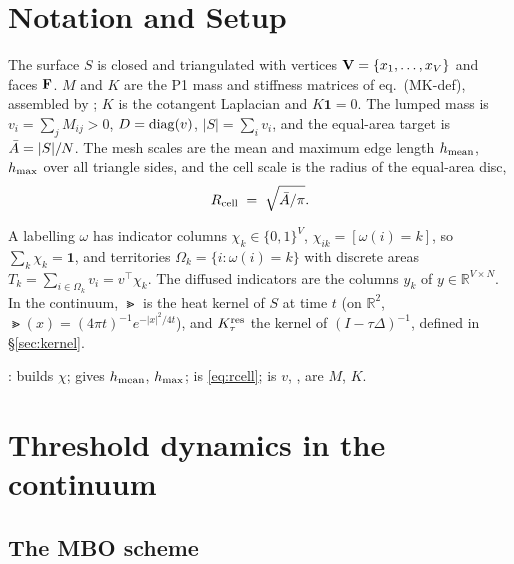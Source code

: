 \documentclass[11pt,a4paper]{article}
\begin{document}
\section{Notation and Setup}
\label{sec:notation}

The surface $S$ is closed and triangulated with vertices $\mathbf{V} = \{x_1, \dots, x_V\}$
and faces $\mathbf{F}$. $M$ and $K$ are the P1 mass and stiffness matrices of
 eq.~(MK-def), assembled by
; $K$ is the cotangent Laplacian and $K\mathbf 1 = 0$.
The lumped mass is $v_i = \sum_j M_{ij} > 0$, $D = \operatorname{diag}(v)$,
$|S| = \sum_i v_i$, and the equal-area target is $\bar{A} = |S|/N$. The mesh scales
are the mean and maximum edge length $h_{\mathrm{mean}}$, $h_{\mathrm{max}}$ over all triangle sides,
and the cell scale is the radius of the equal-area disc,
\begin{equation}
  R_{\mathrm{cell}} \;=\; \sqrt{\bar{A}/\pi}.
  \label{eq:rcell}
\end{equation}

A labelling $\omega$ has indicator columns $\chi_k \in \{0,1\}^V$,
$\chi_{ik} = [\omega(i) = k]$, so $\sum_k \chi_k = \mathbf 1$, and territories
$\Omega_k = \{i : \omega(i) = k\}$ with discrete areas
$T_k = \sum_{i \in \Omega_k} v_i = v^\top \chi_k$. The diffused indicators are the
columns $y_k$ of $y \in \mathbb{R}^{V \times N}$. In the continuum, $\Gt$ is the
heat kernel of $S$ at time $t$ (on $\mathbb{R}^2$,
$\Gt(x) = (4\pi t)^{-1} e^{-|x|^2/4t}$), and $K^{\mathrm{res}}_\tau$ the kernel of
$(I - \tau\Delta)^{-1}$, defined in \S\ref{sec:kernel}.

\begin{tcolorbox}[colback=blue!4!white, colframe=blue!40!black,
                  title={Code: the objects}, fontupper=\small]
: 
builds $\chi$;  gives $h_{\mathrm{mean}}$, $h_{\mathrm{max}}$;
 is \eqref{eq:rcell};  is
$v$, ,  are $M$, $K$.
\end{tcolorbox}

\section{Threshold dynamics in the continuum}
\label{sec:continuum}

\subsection{The MBO scheme}
\end{document}
